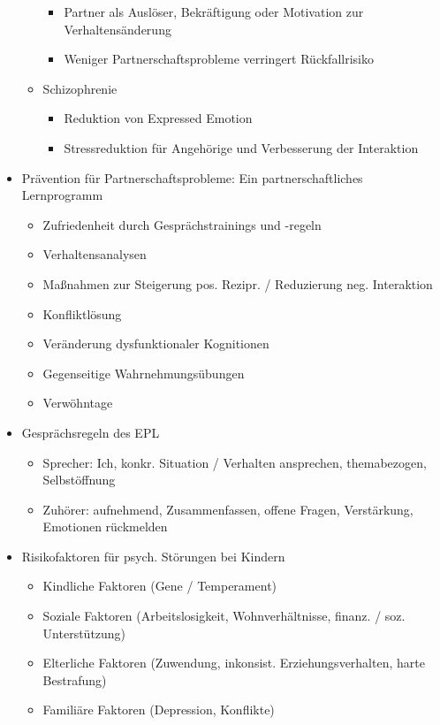 \documentclass[11pt, paper=a4, twocolumn]{scrartcl}
\begin{document}
\begin{itemize}
\begin{itemize}
\begin{itemize}
							\item Partner als Auslöser, Bekräftigung oder Motivation zur Verhaltensänderung
							\item Weniger Partnerschaftsprobleme verringert Rückfallrisiko
						\end{itemize}
					\item Schizophrenie
						\begin{itemize}
							\item Reduktion von Expressed Emotion
							\item Stressreduktion für Angehörige und Verbesserung der Interaktion
						\end{itemize}
				\end{itemize}
			\item Prävention für Partnerschaftsprobleme: Ein partnerschaftliches Lernprogramm
				\begin{itemize}
					\item Zufriedenheit durch Gesprächstrainings und -regeln
					\item Verhaltensanalysen
					\item Maßnahmen zur Steigerung pos. Rezipr. / Reduzierung neg. Interaktion
					\item Konfliktlösung
					\item Veränderung dysfunktionaler Kognitionen
					\item Gegenseitige Wahrnehmungsübungen
					\item Verwöhntage
				\end{itemize}
			\item Gesprächsregeln des EPL
				\begin{itemize}
					\item Sprecher: Ich, konkr. Situation / Verhalten ansprechen, themabezogen, Selbstöffnung
					\item Zuhörer: aufnehmend, Zusammenfassen, offene Fragen, Verstärkung, Emotionen rückmelden
				\end{itemize}
			\item Risikofaktoren für psych. Störungen bei Kindern
				\begin{itemize}
					\item Kindliche Faktoren (Gene / Temperament)
					\item Soziale Faktoren (Arbeitslosigkeit, Wohnverhältnisse, finanz. / soz. Unterstützung)
					\item Elterliche Faktoren (Zuwendung, inkonsist. Erziehungsverhalten, harte Bestrafung)
					\item Familiäre Faktoren (Depression, Konflikte)

\end{itemize}
\end{itemize}
\end{document}
